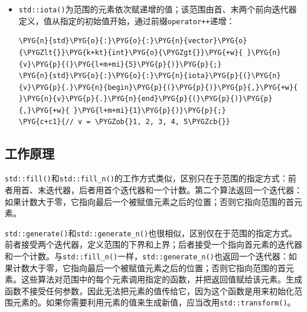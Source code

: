 \begin{itemize}

\item \texttt{std::\allowbreak{}iota()}为范围的元素依次赋递增的值；该范围由首、末两个前向迭代器定义，值从指定的初始值开始，通过前缀\texttt{operator++}递增：



\begin{codeblockbg}
\begin{Verbatim}[commandchars=\\\{\},breaklines=true,breakanywhere=true,fontsize=\codefont,xleftmargin=17bp]
\PYG{n}{std}\PYG{o}{:}\PYG{o}{:}\PYG{n}{vector}\PYG{o}{\PYGZlt{}}\PYG{k+kt}{int}\PYG{o}{\PYGZgt{}}\PYG{+w}{ }\PYG{n}{v}\PYG{p}{(}\PYG{l+m+mi}{5}\PYG{p}{)}\PYG{p}{;}
\PYG{n}{std}\PYG{o}{:}\PYG{o}{:}\PYG{n}{iota}\PYG{p}{(}\PYG{n}{v}\PYG{p}{.}\PYG{n}{begin}\PYG{p}{(}\PYG{p}{)}\PYG{p}{,}\PYG{+w}{ }\PYG{n}{v}\PYG{p}{.}\PYG{n}{end}\PYG{p}{(}\PYG{p}{)}\PYG{p}{,}\PYG{+w}{ }\PYG{l+m+mi}{1}\PYG{p}{)}\PYG{p}{;}
\PYG{c+c1}{// v = \PYGZob{}1, 2, 3, 4, 5\PYGZcb{}}
\end{Verbatim}
\end{codeblockbg}

\end{itemize}



\subsection{工作原理}



\texttt{std::\allowbreak{}fill()}和\texttt{std::\allowbreak{}fill\_\allowbreak{}n()}的工作方式类似，区别只在于范围的指定方式：前者用首、末迭代器，后者用首个迭代器和一个计数。第二个算法返回一个迭代器：如果计数大于零，它指向最后一个被赋值元素之后的位置；否则它指向范围的首元素。



\texttt{std::\allowbreak{}generate()}和\texttt{std::\allowbreak{}generate\_\allowbreak{}n()}也很相似，区别仅在于范围的指定方式。前者接受两个迭代器，定义范围的下界和上界；后者接受一个指向首元素的迭代器和一个计数。与\texttt{std::\allowbreak{}fill\_\allowbreak{}n()}一样，\texttt{std::\allowbreak{}generate\_\allowbreak{}n()}也返回一个迭代器：如果计数大于零，它指向最后一个被赋值元素之后的位置；否则它指向范围的首元素。这些算法对范围中的每个元素调用指定的函数，并把返回值赋给该元素。生成函数不接受任何参数，因此无法把元素的值传给它，因为这个函数是用来初始化范围元素的。如果你需要利用元素的值来生成新值，应当改用\texttt{std::\allowbreak{}transform()}。


